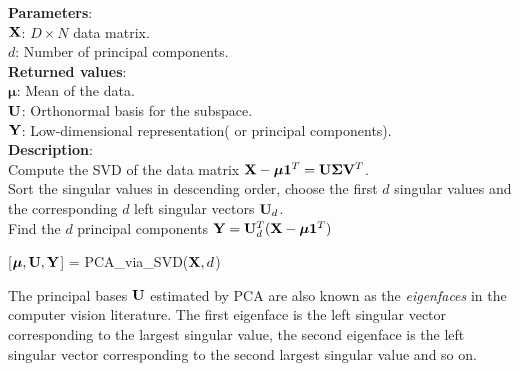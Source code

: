 \documentclass[english,onecolumn]{IEEEtran}
\newcommand{\bV}{{\bf V}}
\newcommand{\bY}{{\bf Y}}
\newcommand{\bX}{{\bf X}}
\newcommand{\bmu}{{\boldsymbol \mu}}
\newcommand{\bSig}{{\boldsymbol \Sigma}}
\newcommand{\bone}{{\boldsymbol 1}}
\newcommand{\bU}{{\bf U}}
\begin{document}
\vspace{0.5cm}
\begin{algorithm}[H]
\textbf{Parameters}:\\
$\bX$: \quad $D\times N $ data matrix.\\
$d$: \quad Number of principal components.\\
\textbf{Returned values}:\\
$\bmu$: \quad Mean of the data.\\
$\bU$: \quad Orthonormal basis for the subspace.\\
$\bY$: \quad Low-dimensional representation( or principal components).\\
\textbf{Description}:\\
Compute the SVD of the data matrix $\bX - \bmu \bone^T = \bU \bSig \bV^T$.\\
Sort the singular values in descending order, choose the first $d$ singular values and the corresponding $d$ left singular vectors $\bU_d$.\\
Find the $d$ principal components $\bY = \bU_d^T(\bX - \bmu \bone^T)$
\caption{[$\bmu, \bU, \bY$] = PCA\_via\_SVD($\bX,d$) }
\label{Alg:PCA}
\end{algorithm}
\vspace{0.5cm}

The principal bases $\bU$ estimated by PCA are also known as the \textit{eigenfaces} in the computer vision literature. The first eigenface is the left singular vector corresponding to the largest singular value, the second eigenface is the left singular vector corresponding to the second largest singular value and so on.
\end{document}
